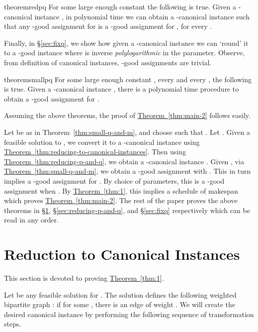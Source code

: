 \documentclass[11pt]{article}
\newenvironment{proofof}[1]{\rm \trivlist \item[\hskip \labelsep{\it #1.\/}]}{\outerparskip 0pt\endtrivlist}
\newenvironment{proofof}[1]{\begin{proof}[#1]}{\end{proof}}
\newcommand{\Sec}[1]{\texorpdfstring{\hyperref[sec:#1]{\S\ref*{sec:#1}}}{\S\ref*{sec:#1}}} \newcommand{\Eqn}[1]{\texorpdfstring{\hyperref[eq:#1]{(\ref*{eq:#1})}}{(\ref*{eq:#1})}} \newcommand{\Thm}[1]{\texorpdfstring{\hyperref[thm:#1]{Theorem~\ref*{thm:#1}}}{Theorem~\ref*{thm:#1}}} \newcommand{\Lem}[1]{\texorpdfstring{\hyperref[lem:#1]{Lemma~\ref*{lem:#1}}}{Lemma~\ref*{lem:#1}}} \newcommand{\Def}[1]{\texorpdfstring{\hyperref[def:#1]{Definition~\ref*{def:#1}}}{Definition~\ref*{def:#1}}} \newcommand{\Clm}[1]{\texorpdfstring{\hyperref[clm:#1]{Claim~\ref*{clm:#1}}}{Claim~\ref*{clm:#1}}} \newcommand{\App}[1]{\hyperref[app:#1]{Appendix~\ref*{app:#1}}}
\begin{document}
\begin{restatable}{theorem}{redpq}
\label{thm:reducing-p-and-q}\label{thm:2}
For some large enough constant  the following is true. Given a -canonical instance , in polynomial time we can obtain a -canonical instance  such that any -good assignment for  is a -good assignment for , for every .
\end{restatable}
\noindent
Finally, in \Sec{fixq}, we show how given a -canonical instance we can `round' it to a -good instance where  is inverse {\em polylogarithmic} in the  parameter. Observe, from definition of canonical instances, -good assignments are trivial.

\begin{restatable}{theorem}{smallpq}
\label{thm:small-q-and-m}
For some large enough constant , every  and every , the following is true. Given a -canonical instance , there is a polynomial time procedure  to obtain a -good assignment for .
\end{restatable}
\noindent
Assuming the above theorems, the proof of \Thm{main-2} follows easily.
\begin{proofof}{\bf Proof of Theorem \ref{thm:main-2}} Let  be as in Theorem~\ref{thm:small-q-and-m}, and choose   such that . Let . Given a feasible solution to , we convert it to a -canonical instance  using \Thm{reducing-to-canonical-instances}. Then using \Thm{reducing-p-and-q}, we obtain a -canonical instance . Given , via \Thm{small-q-and-m}, we obtain a -good assignment with . This in turn implies a  -good assignment for . By choice of parameters, this is a -good assignment when .
By \Thm{1}, this implies a schedule of makespan  which proves \Thm{main-2}.
\end{proofof}
\noindent
The rest of the paper proves the above theorems in \Sec{app-canonical}, \Sec{reducing-p-and-q}, and \Sec{fixq} respectively which can be read in any order.

\section{Reduction to Canonical Instances}

\label{sec:app-canonical}
\label{app:app-canonical}
This section is devoted to proving \Thm{1}.
\redtocanon*

Let  be any feasible solution for .  The solution  defines the following weighted bipartite graph : if  for some ,  there is an edge  of weight . We will create the desired canonical instance  by performing the following sequence of transformation steps. 
\end{document}
